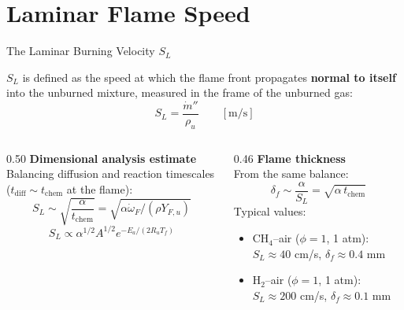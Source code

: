\documentclass[12pt,aspectratio=169]{beamer}
\newcommand{\mdot}{\dot{m}}
\newcommand{\wdot}{\dot{\omega}}
\newcommand{\SL}{S_L}
\newcommand{\lf}{\delta_f}
\newcommand{\tchem}{t_{\text{chem}}}
\newcommand{\tdiff}{t_{\text{diff}}}
\newcommand{\alphath}{\alpha}
\begin{document}
\section{Laminar Flame Speed}

\begin{frame}{The Laminar Burning Velocity $\SL$}

  $\SL$ is defined as the speed at which the flame front propagates
  \textbf{normal to itself} into the unburned mixture,
  measured in the frame of the unburned gas:
  \[
    \SL = \frac{\mdot''}{\rho_u}
    \qquad [\text{m/s}]
  \]

  \begin{columns}[t]
    \begin{column}{0.50\textwidth}
      \textbf{Dimensional analysis estimate}\\
      Balancing diffusion and reaction timescales
      ($\tdiff \sim \tchem$ at the flame):
      \[
        \SL \sim \sqrt{\frac{\alphath}{\tchem}}
        = \sqrt{\alpha \wdot_F/(\rho Y_{F,u})}
      \]
      \[
        \SL \propto \alpha^{1/2} A^{1/2} e^{-E_a/(2R_u T_f)}
      \]
    \end{column}
    \begin{column}{0.46\textwidth}
      \textbf{Flame thickness}\\
      From the same balance:
      \[
        \lf \sim \frac{\alphath}{\SL}
        = \sqrt{\alphath\,\tchem}
      \]
      Typical values:
      \begin{itemize}
        \item CH$_4$--air ($\phi=1$, 1 atm): $\SL \approx 40$ cm/s,
              $\lf \approx 0.4$ mm
        \item H$_2$--air ($\phi=1$, 1 atm): $\SL \approx 200$ cm/s,
              $\lf \approx 0.1$ mm
      \end{itemize}
    \end{column}
  \end{columns}
\end{frame}
\end{document}
